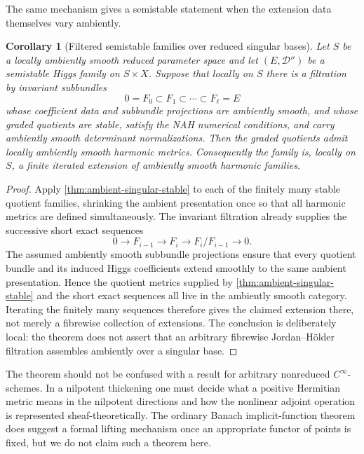 \documentclass[11pt,reqno]{amsart}
\newtheorem{corollary}[theorem]{Corollary}
\theoremstyle{definition}
\theoremstyle{remark}
\newcommand{\cD}{\mathcal D}
\begin{document}
The same mechanism gives a semistable statement when the extension data themselves vary ambiently.

\begin{corollary}[Filtered semistable families over reduced singular bases]\label{cor:singular-filtered-semistable}
Let $S$ be a locally ambiently smooth reduced parameter space and let $(E,\cD'')$ be a semistable Higgs family on $S\times X$.  Suppose that locally on $S$ there is a filtration by invariant subbundles
\[
  0=F_0\subset F_1\subset\cdots\subset F_\ell=E
\]
whose coefficient data and subbundle projections are ambiently smooth, and whose graded quotients are stable, satisfy the NAH numerical conditions, and carry ambiently smooth determinant normalizations.  Then the graded quotients admit locally ambiently smooth harmonic metrics.  Consequently the family is, locally on $S$, a finite iterated extension of ambiently smooth harmonic families.
\end{corollary}

\begin{proof}
Apply \cref{thm:ambient-singular-stable} to each of the finitely many stable quotient families, shrinking the ambient presentation once so that all harmonic metrics are defined simultaneously.  The invariant filtration already supplies the successive short exact sequences
\[
  0\to F_{i-1}\to F_i\to F_i/F_{i-1}\to0.
\]
The assumed ambiently smooth subbundle projections ensure that every
quotient bundle and its induced Higgs coefficients extend smoothly to
the same ambient presentation.  Hence the quotient metrics supplied by
\cref{thm:ambient-singular-stable} and the short exact sequences all
live in the ambiently smooth category.  Iterating the finitely many
sequences therefore gives the claimed extension there, not merely a
fibrewise collection of extensions.  The conclusion is deliberately
local: the theorem does not assert that an arbitrary fibrewise
Jordan--H\"older filtration assembles ambiently over a singular base.
\end{proof}

The theorem should not be confused with a result for arbitrary nonreduced $C^\infty$-schemes.  In a nilpotent thickening one must decide what a positive Hermitian metric means in the nilpotent directions and how the nonlinear adjoint operation is represented sheaf-theoretically.  The ordinary Banach implicit-function theorem does suggest a formal lifting mechanism once an appropriate functor of points is fixed, but we do not claim such a theorem here.
\end{document}
